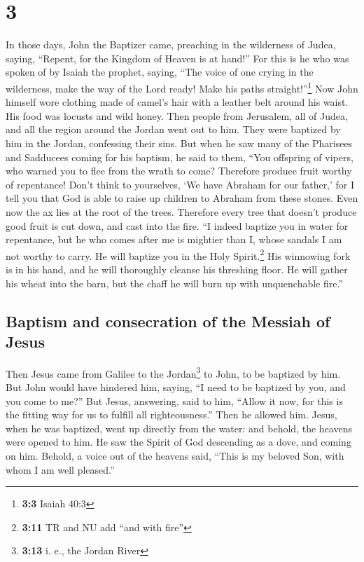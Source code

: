 \hypertarget{section-2}{%
\section{3}\label{section-2}}

 In those days, John the Baptizer came, preaching in the
wilderness of Judea, saying,  ``Repent, for the Kingdom of
Heaven is at hand!''  For this is he who was spoken of by
Isaiah the prophet, saying, ``The voice of one crying in the wilderness,
make the way of the Lord ready! Make his paths straight!''\footnote{\textbf{3:3}
  Isaiah 40:3}  Now John himself wore clothing made of
camel's hair with a leather belt around his waist. His food was locusts
and wild honey.  Then people from Jerusalem, all of Judea,
and all the region around the Jordan went out to him. 
They were baptized by him in the Jordan, confessing their sins.
 But when he saw many of the Pharisees and Sadducees
coming for his baptism, he said to them, ``You offspring of vipers, who
warned you to flee from the wrath to come?  Therefore
produce fruit worthy of repentance!  Don't think to
yourselves, `We have Abraham for our father,' for I tell you that God is
able to raise up children to Abraham from these stones. 
Even now the ax lies at the root of the trees. Therefore every tree that
doesn't produce good fruit is cut down, and cast into the fire.
 ``I indeed baptize you in water for repentance, but he
who comes after me is mightier than I, whose sandals I am not worthy to
carry. He will baptize you in the Holy Spirit.\footnote{\textbf{3:11} TR
  and NU add ``and with fire''}  His winnowing fork is in
his hand, and he will thoroughly cleanse his threshing floor. He will
gather his wheat into the barn, but the chaff he will burn up with
unquenchable fire.''

\hypertarget{baptism-and-consecration-of-the-messiah-of-jesus}{%
\subsection{Baptism and consecration of the Messiah of
Jesus}\label{baptism-and-consecration-of-the-messiah-of-jesus}}

 Then Jesus came from Galilee to the Jordan\footnote{\textbf{3:13}
  i. e., the Jordan River} to John, to be baptized by him.
 But John would have hindered him, saying, ``I need to be
baptized by you, and you come to me?''  But Jesus,
answering, said to him, ``Allow it now, for this is the fitting way for
us to fulfill all righteousness.'' Then he allowed him. 
Jesus, when he was baptized, went up directly from the water: and
behold, the heavens were opened to him. He saw the Spirit of God
descending as a dove, and coming on him.  Behold, a voice
out of the heavens said, ``This is my beloved Son, with whom I am well
pleased.''

